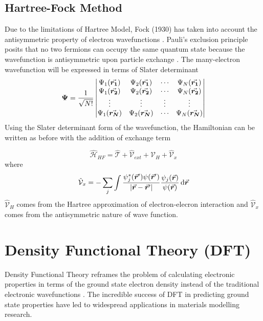 \subsection{Hartree-Fock Method}
Due to the limitations of Hartree Model, Fock (1930) has taken into account the antisymmetric property of electron wavefunctions \citep{Fock1930}. Pauli's exclusion principle posits that no two fermions can occupy the same quantum state because the wavefunction is antisymmetric upon particle exchange \citep{Pauli1925}. The many-electron wavefunction will be expressed in terms of Slater determinant \citep{Slater1929}
\begin{equation}
	\mathbf{\Psi} = \frac{1}{\sqrt{N!}} \mdet{\Psi_1({\va*{r_1}}) & \Psi_2({\va*{r_1}}) & \cdots & \Psi_N({\va*{r_1}})  \\
		\Psi_1({\va*{r_2}}) & \Psi_2({\va*{r_2}}) & \cdots & \Psi_N({\va*{r_2}})\\
		\vdots & \vdots & \vdots & \vdots \\
		\Psi_1({\va*{r_N}}) & \Psi_2({\va*{r_N}}) & \cdots & \Psi_N({\va*{r_N}})
	}
\end{equation}
Using the Slater determinant form of the wavefunction, the Hamiltonian can be written as before with the addition of exchange term

\begin{equation} \label{eq:HF_H}
	\hat{\mathcal{H}}_{HF}  = \hat{\mathcal{T}}  + \hat{\mathcal{V}}_{ext} + \hat{\mathcal{V}}_H + \hat{\mathcal{V}}_x
\end{equation}
where
\begin{equation}
	\hat{\mathcal{V}}_x = - \sum_j \int \frac{\psi_j^*(\va*{r}') \psi(\va*{r}')}{\abs{{\va*{r} - \va*{r}'}} } \frac{\psi_j(\va*{r})}{\psi(\va*{r})} \dd{\va*{r}}
\end{equation}
$\hat{\mathcal{V}}_H$ comes from the Hartree approximation of electron-elecron interaction and $\hat{\mathcal{V}}_x$ comes from the antisymmetric
nature of wave function.

\section{Density Functional Theory (DFT)}
Density Functional Theory reframes the problem of calculating electronic properties in terms of the ground state electron density instead of the traditional electronic wavefunctions \citep{Kohn1999}. The incredible success of DFT in predicting ground state properties have led to widespread applications in materials modelling research.

